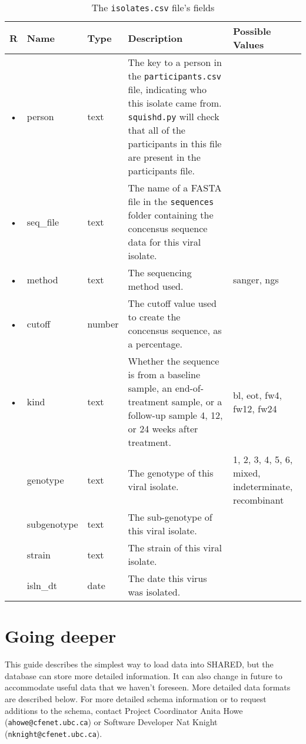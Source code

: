 \documentclass{article}
\begin{document}
\begin{table}[h!]
  \centering
  \caption{The \texttt{isolates.csv} file's fields}
  \label{tbl:isolates.csv}
  \begin{tabular}{cllp{6cm}p{4cm}}
    R & Name        & Type      & Description & Possible Values\\ \hline
    • & person      & text    & The key to a person in the
    \texttt{participants.csv} file, indicating who this isolate came
    from. \texttt{squishd.py} will check that all of the participants
    in this file are present in the participants file. & \\
    • & seq\_file   & text    & The name of a FASTA file in the
    \texttt{sequences} folder containing the concensus sequence data for this viral isolate. & \\ 
    • & method      & text    & The sequencing method used. & sanger, ngs \\
    • & cutoff      & number  & The cutoff value used to create the concensus sequence, as a percentage. & \\
    • & kind        & text    & Whether the sequence is from a baseline sample, an end-of-treatment sample, or a follow-up sample 4, 12, or 24 weeks after treatment. & bl, eot, fw4, fw12, fw24 \\
    & genotype    & text    & The genotype of this viral isolate. &
    1, 2, 3, 4, 5, 6, mixed, indeterminate, recombinant \\
    & subgenotype & text    & The sub-genotype of this viral isolate. & \\
    & strain      & text    & The strain of this viral isolate. & \\
    & isln\_dt    & date      & The date this virus was isolated. & \\
    
  \end{tabular}
\end{table}


\section{Going deeper}

This guide describes the simplest way to load data into SHARED, but
the database can store more detailed information. It can also change
in future to accommodate useful data that we haven't foreseen. More
detailed data formats are described below. For more detailed schema
information or to request additions to the schema, contact Project
Coordinator Anita Howe (\texttt{ahowe@cfenet.ubc.ca}) or Software
Developer Nat Knight (\texttt{nknight@cfenet.ubc.ca}).
\end{document}

